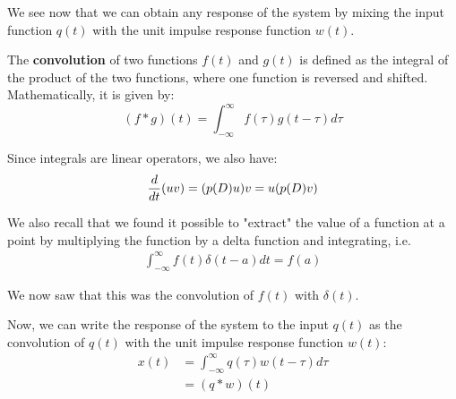 We see now that we can obtain any response of the system by mixing the input function $q(t)$ with the unit impulse response function $w(t)$. 


{
    The \textbf{convolution} of two functions $f(t)$ and $g(t)$ is defined as the integral of the product of the two functions, where one function is reversed and shifted. Mathematically, it is given by:
    \[
    (f * g)(t) = \int_{-\infty}^{\infty} f(\tau) g(t - \tau) d\tau
    \]
}

Since integrals are linear operators, we also have:
\begin{align*}
\frac{d}{dt} (u \* v) = (p(D) u) \* v = u \* (p(D) v)
\end{align*}

We also recall that we found it possible to "extract" the value of a function at a point by multiplying the function by a delta function and integrating, i.e.
\begin{align*}
\int_{-\infty}^{\infty} f(t) \delta(t - a) dt = f(a)
\end{align*}

We now saw that this was the convolution of $f(t)$ with $\delta(t)$.

Now, we can write the response of the system to the input $q(t)$ as the convolution of $q(t)$ with the unit impulse response function $w(t)$:
\begin{align*}
x(t) &= \int_{-\infty}^{\infty} q(\tau) w(t - \tau) d\tau \\
&= (q * w)(t)
\end{align*}


